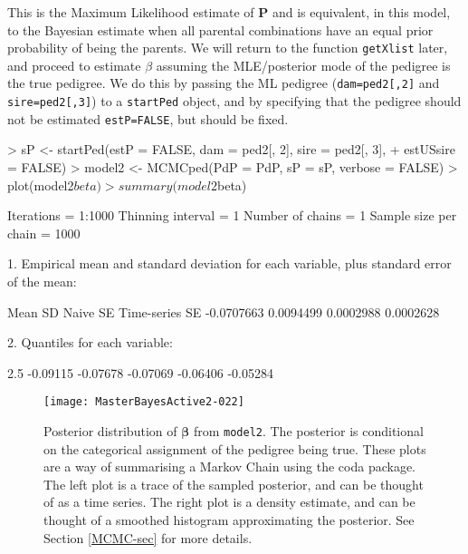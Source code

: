 \documentclass{article}
\begin{document}
This is the Maximum Likelihood estimate of ${\bm P}$ and is equivalent, in this model, to the Bayesian estimate when all parental combinations have an equal prior probability of being the parents.  We will return to the function \texttt{getXlist} later, and proceed to estimate $\beta$ assuming the MLE/posterior mode of the pedigree is the true pedigree.  We do this by passing the ML pedigree (\texttt{dam=ped2[,2]} and \texttt{sire=ped2[,3]}) to a \texttt{startPed} object, and by specifying that the pedigree should not be estimated \texttt{estP=FALSE}, but should be fixed.

\begin{Schunk}
\begin{Sinput}
> sP <- startPed(estP = FALSE, dam = ped2[, 2], sire = ped2[, 3], 
+     estUSsire = FALSE)
> model2 <- MCMCped(PdP = PdP, sP = sP, verbose = FALSE)
> plot(model2$beta)
> summary(model2$beta)
\end{Sinput}
\begin{Soutput}
Iterations = 1:1000
Thinning interval = 1 
Number of chains = 1 
Sample size per chain = 1000 

1. Empirical mean and standard deviation for each variable,
   plus standard error of the mean:

          Mean             SD       Naive SE Time-series SE 
    -0.0707663      0.0094499      0.0002988      0.0002628 

2. Quantiles for each variable:

    2.5%      25%      50%      75%    97.5% 
-0.09115 -0.07678 -0.07069 -0.06406 -0.05284 
\end{Soutput}
\end{Schunk}



\begin{figure}[!h]
\begin{center}
\texttt{[image: MasterBayesActive2-022]}
\end{center}
\caption{Posterior distribution of $\bm{\beta}$ from \texttt{model2}. The posterior is conditional on the categorical assignment of the pedigree being true. These plots are a way of summarising a Markov Chain using the coda package.  The left plot is a trace of the sampled posterior, and can be thought of as a time series.  The right plot is a density estimate, and can be thought of a smoothed histogram approximating the posterior.  See Section \ref{MCMC-sec} for more details.}
\label{model2beta}
\end{figure}
\end{document}
